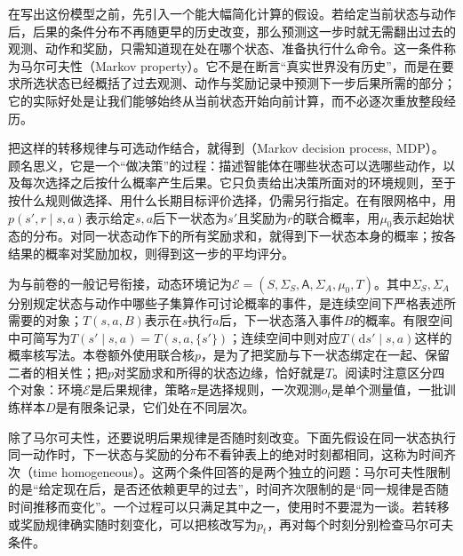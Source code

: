 在写出这份模型之前，先引入一个能大幅简化计算的假设。若给定当前状态与动作后，后果的条件分布不再随更早的历史改变，那么预测这一步时就无需翻出过去的观测、动作和奖励，只需知道现在处在哪个状态、准备执行什么命令。这一条件称为马尔可夫性（Markov property）。它不是在断言“真实世界没有历史”，而是在要求所选状态已经概括了过去观测、动作与奖励记录中预测下一步后果所需的部分；它的实际好处是让我们能够始终从当前状态开始向前计算，而不必逐次重放整段经历。

把这样的转移规律与可选动作结合，就得到（Markov decision process, MDP）。顾名思义，它是一个“做决策”的过程：描述智能体在哪些状态可以选哪些动作，以及每次选择之后按什么概率产生后果。它只负责给出决策所面对的环境规则，至于按什么规则做选择、用什么长期目标评价选择，仍需另行指定。在有限网格中，用$p(s',r\mid s,a)$表示给定$s,a$后下一状态为$s'$且奖励为$r$的联合概率，用$\mu_0$表示起始状态的分布。对同一状态动作下的所有奖励求和，就得到下一状态本身的概率；按各结果的概率对奖励加权，则得到这一步的平均评分。

为与前卷的一般记号衔接，动态环境记为$\mathcal E=(S,\Sigma_S,\mathsf A,\Sigma_A,\mu_0,T)$。其中$\Sigma_S,\Sigma_A$分别规定状态与动作中哪些子集算作可讨论概率的事件，是连续空间下严格表述所需要的对象；$T(s,a,B)$表示在$s$执行$a$后，下一状态落入事件$B$的概率。有限空间中可简写为$T(s'\mid s,a)=T(s,a,\{s'\})$；连续空间中则对应$T(\mathrm ds'\mid s,a)$这样的概率核写法。本卷额外使用联合核$p$，是为了把奖励与下一状态绑定在一起、保留二者的相关性；把$p$对奖励求和所得的状态边缘，恰好就是$T$。阅读时注意区分四个对象：环境$\mathcal E$是后果规律，策略$\pi$是选择规则，一次观测$o_t$是单个测量值，一批训练样本$D$是有限条记录，它们处在不同层次。

除了马尔可夫性，还要说明后果规律是否随时刻改变。下面先假设在同一状态执行同一动作时，下一状态与奖励的分布不看钟表上的绝对时刻都相同，这称为时间齐次（time homogeneous）。这两个条件回答的是两个独立的问题：马尔可夫性限制的是“给定现在后，是否还依赖更早的过去”，时间齐次限制的是“同一规律是否随时间推移而变化”。一个过程可以只满足其中之一，使用时不要混为一谈。若转移或奖励规律确实随时刻变化，可以把核改写为$p_t$，再对每个时刻分别检查马尔可夫条件。

